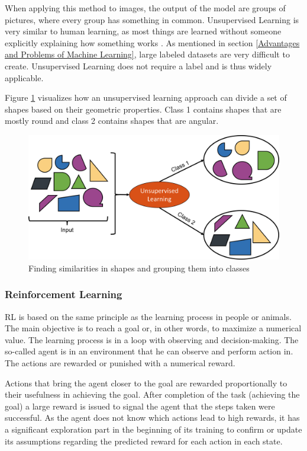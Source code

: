 When applying this method to images, the output of the model are groups of pictures, where every group has something in common. Unsupervised Learning is very similar to human learning, as most things are learned without someone explicitly explaining how something works \cite{Murphy}. As mentioned in section \ref{Advantages and Problems of Machine Learning}, large labeled datasets are very difficult to create. Unsupervised Learning does not require a label and is thus widely applicable.

Figure \ref{fig:USL} visualizes how an unsupervised learning approach can divide a set of shapes based on their geometric properties. Class 1 contains shapes that are mostly round and class 2 contains shapes that are angular. 

\begin{figure}[H]
	\centering
	\includegraphics[width=0.9\linewidth]{IMGs/USL.png}
 	\caption{Finding similarities in shapes and grouping them into classes}
 	\label{fig:USL}
\end{figure}


\subsubsection*{Reinforcement Learning}

RL is based on the same principle as the learning process in people or animals. The main objective is to reach a goal or, in other words, to maximize a numerical value. The learning process is in a loop with observing and decision-making. The so-called agent is in an environment that he can observe and perform action in. The actions are rewarded or punished with a numerical reward. \cite{LEX}
 
Actions that bring the agent closer to the goal are rewarded proportionally to their usefulness in achieving the goal. After completion of the task (achieving the goal) a large reward is issued to signal the agent that the steps taken were successful. As the agent does not know which actions lead to high rewards, it has a significant exploration part in the beginning of its training to confirm or update its assumptions regarding the predicted reward for each action in each state.~\cite{Sutton}

